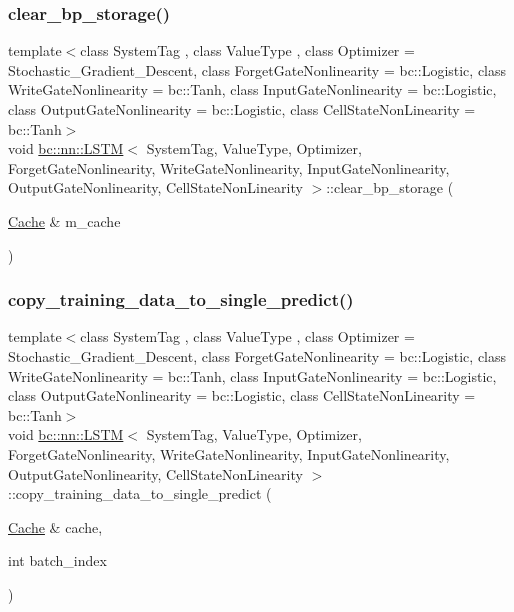 \subsubsection{\texorpdfstring{clear\+\_\+bp\+\_\+storage()}{clear\_bp\_storage()}}
{\footnotesize\ttfamily template$<$class System\+Tag , class Value\+Type , class Optimizer  = Stochastic\+\_\+\+Gradient\+\_\+\+Descent, class Forget\+Gate\+Nonlinearity  = bc\+::\+Logistic, class Write\+Gate\+Nonlinearity  = bc\+::\+Tanh, class Input\+Gate\+Nonlinearity  = bc\+::\+Logistic, class Output\+Gate\+Nonlinearity  = bc\+::\+Logistic, class Cell\+State\+Non\+Linearity  = bc\+::\+Tanh$>$ \\
void \hyperlink{structbc_1_1nn_1_1LSTM}{bc\+::nn\+::\+L\+S\+TM}$<$ System\+Tag, Value\+Type, Optimizer, Forget\+Gate\+Nonlinearity, Write\+Gate\+Nonlinearity, Input\+Gate\+Nonlinearity, Output\+Gate\+Nonlinearity, Cell\+State\+Non\+Linearity $>$\+::clear\+\_\+bp\+\_\+storage (\begin{DoxyParamCaption}\item[{\hyperlink{structbc_1_1nn_1_1Cache}{Cache} \&}]{m\+\_\+cache }\end{DoxyParamCaption})\hspace{0.3cm}{\ttfamily [inline]}}

\mbox{\label{structbc_1_1nn_1_1LSTM_a4ee041e97fa17ae5a17f143e4b28c077}} 
\subsubsection{\texorpdfstring{copy\+\_\+training\+\_\+data\+\_\+to\+\_\+single\+\_\+predict()}{copy\_training\_data\_to\_single\_predict()}}
{\footnotesize\ttfamily template$<$class System\+Tag , class Value\+Type , class Optimizer  = Stochastic\+\_\+\+Gradient\+\_\+\+Descent, class Forget\+Gate\+Nonlinearity  = bc\+::\+Logistic, class Write\+Gate\+Nonlinearity  = bc\+::\+Tanh, class Input\+Gate\+Nonlinearity  = bc\+::\+Logistic, class Output\+Gate\+Nonlinearity  = bc\+::\+Logistic, class Cell\+State\+Non\+Linearity  = bc\+::\+Tanh$>$ \\
void \hyperlink{structbc_1_1nn_1_1LSTM}{bc\+::nn\+::\+L\+S\+TM}$<$ System\+Tag, Value\+Type, Optimizer, Forget\+Gate\+Nonlinearity, Write\+Gate\+Nonlinearity, Input\+Gate\+Nonlinearity, Output\+Gate\+Nonlinearity, Cell\+State\+Non\+Linearity $>$\+::copy\+\_\+training\+\_\+data\+\_\+to\+\_\+single\+\_\+predict (\begin{DoxyParamCaption}\item[{\hyperlink{structbc_1_1nn_1_1Cache}{Cache} \&}]{cache,  }\item[{int}]{batch\+\_\+index }\end{DoxyParamCaption})\hspace{0.3cm}{\ttfamily [inline]}}

